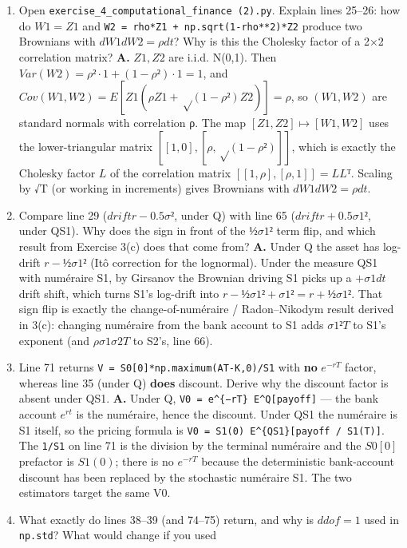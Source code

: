 \documentclass[
  11pt,
]{article}
\begin{document}
\begin{enumerate}
\def\labelenumi{\arabic{enumi}.}
\setcounter{enumi}{8}
\item
  Open \texttt{exercise\_4\_computational\_finance\ (2).py}. Explain
  lines 25--26: how do \(W1 = Z1\) and
  \texttt{W2\ =\ rho*Z1\ +\ np.sqrt(1-rho**2)*Z2} produce two Brownians
  with \(dW1 dW2 = ρ dt\)? Why is this the Cholesky factor of a 2×2
  correlation matrix? \textbf{A.} \(Z1, Z2\) are i.i.d. N(0,1). Then
  \(Var(W2) = ρ²·1 + (1−ρ²)·1 = 1\), and
  \(Cov(W1,W2) = E[Z1(ρZ1 + √(1−ρ²)Z2)] = ρ\), so \((W1,W2)\) are
  standard normals with correlation ρ. The map \([Z1,Z2] ↦ [W1,W2]\)
  uses the lower-triangular matrix \([[1,0],[ρ,√(1−ρ²)]]\), which is
  exactly the Cholesky factor \(L\) of the correlation matrix
  \([[1,ρ],[ρ,1]] = L Lᵀ\). Scaling by √T (or working in increments)
  gives Brownians with \(dW1 dW2 = ρ dt\).
\item
  Compare line 29 (\(drift r − 0.5σ²\), under Q) with line 65
  (\(drift r + 0.5σ1²\), under QS1). Why does the sign in front of the
  \(½σ1²\) term flip, and which result from Exercise 3(c) does that come
  from? \textbf{A.} Under Q the asset has log-drift \(r − ½σ1²\) (Itô
  correction for the lognormal). Under the measure QS1 with numéraire
  S1, by Girsanov the Brownian driving S1 picks up a \(+σ1 dt\) drift
  shift, which turns S1's log-drift into \(r − ½σ1² + σ1² = r + ½σ1²\).
  That sign flip is exactly the change-of-numéraire / Radon--Nikodym
  result derived in 3(c): changing numéraire from the bank account to S1
  adds \(σ1²T\) to S1's exponent (and \(ρσ1σ2 T\) to S2's, line 66).
\item
  Line 71 returns \texttt{V\ =\ S0{[}0{]}*np.maximum(AT-K,0)/S1} with
  \textbf{no} \(e^{−rT}\) factor, whereas line 35 (under Q)
  \textbf{does} discount. Derive why the discount factor is absent under
  QS1. \textbf{A.} Under Q,
  \texttt{V0\ =\ e\^{}\{−rT\}\ E\^{}Q{[}payoff{]}} --- the bank account
  \(e^{rt}\) is the numéraire, hence the discount. Under QS1 the
  numéraire is S1 itself, so the pricing formula is
  \texttt{V0\ =\ S1(0)\ E\^{}\{QS1\}{[}payoff\ /\ S1(T){]}}. The
  \texttt{1/S1} on line 71 is the division by the terminal numéraire and
  the \(S0[0]\) prefactor is \(S1(0)\); there is no \(e^{−rT}\) because
  the deterministic bank-account discount has been replaced by the
  stochastic numéraire S1. The two estimators target the same V0.
\item
  What exactly do lines 38--39 (and 74--75) return, and why is
  \(ddof=1\) used in \texttt{np.std}? What would change if you used

\end{enumerate}
\end{document}
